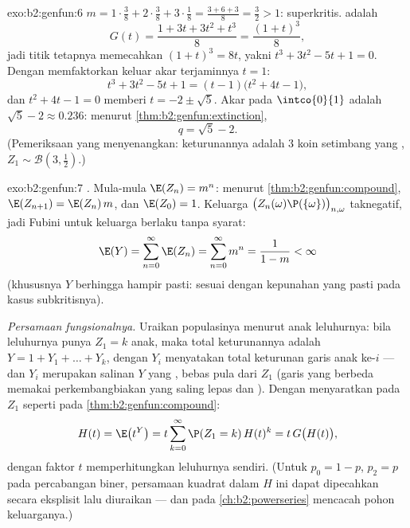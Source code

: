 \begin{solution}{exo:b2:genfun:6}
$m = 1\cdot\frac38 + 2\cdot\frac38 + 3\cdot\frac18 = \frac{3 + 6 +
3}{8} = \frac32 > 1$: superkritis.  adalah
\[
G(t) = \frac{1 + 3t + 3t^2 + t^3}{8} = \frac{(1 + t)^3}{8} ,
\]
jadi titik tetapnya memecahkan $(1 + t)^3 = 8t$, yakni $t^3 + 3t^2 - 5t + 1
= 0$. Dengan memfaktorkan keluar akar terjaminnya $t = 1$:
\[
t^3 + 3t^2 - 5t + 1 = (t - 1)\bigl(t^2 + 4t - 1\bigr),
\]
dan $t^2 + 4t - 1 = 0$ memberi $t = -2 \pm \sqrt5$. Akar pada
$\intco{0}{1}$ adalah $\sqrt5 - 2 \approx 0.236$: menurut
\cref{thm:b2:genfun:extinction},
\[
q = \sqrt 5 - 2 .
\]
(Pemeriksaan yang menyenangkan:  keturunannya adalah  $3$ koin
setimbang yang , $Z_1 \sim \mathcal{B}(3, \frac12)$.)
\end{solution}

\begin{solution}{exo:b2:genfun:7}
\emph{.} Mula-mula $\E(Z_n) = m^n$: menurut
\cref{thm:b2:genfun:compound}, $\E(Z_{n+1}) = \E(Z_n)\,m$, dan
$\E(Z_0) = 1$. Keluarga $\bigl(Z_n(\omega)\P(\{\omega\})
\bigr)_{n, \omega}$ taknegatif, jadi Fubini untuk keluarga berlaku
tanpa syarat:
\[
\E(Y) = \sum_{n=0}^{\infty}\E(Z_n)
= \sum_{n=0}^\infty m^n = \frac{1}{1 - m} < \infty
\]
(khususnya $Y$ berhingga hampir pasti: sesuai dengan
kepunahan yang pasti pada kasus subkritisnya).

\emph{Persamaan fungsionalnya.} Uraikan populasinya menurut
anak leluhurnya: bila leluhurnya punya $Z_1 = k$ anak, maka
total keturunannya adalah $Y = 1 + Y_1 + \dots + Y_k$, dengan $Y_i$ menyatakan
total keturunan garis anak ke-$i$ --- dan $Y_i$ merupakan
salinan $Y$ yang , bebas pula dari $Z_1$ (garis yang berbeda
memakai  perkembangbiakan yang saling lepas dan ). Dengan menyaratkan pada
$Z_1$ seperti pada \cref{thm:b2:genfun:compound}:
\[
H(t) = \E\bigl(t^Y\bigr)
= t\sum_{k=0}^\infty \P(Z_1 = k)\,H(t)^k
= t\,G\bigl(H(t)\bigr),
\]
dengan faktor $t$ memperhitungkan leluhurnya sendiri. (Untuk
 $p_0 = 1 - p$, $p_2 = p$ pada percabangan biner, persamaan kuadrat
dalam $H$ ini dapat dipecahkan secara eksplisit lalu diuraikan --- dan
 pada \cref{ch:b2:powerseries} mencacah pohon
keluarganya.)
\end{solution}

